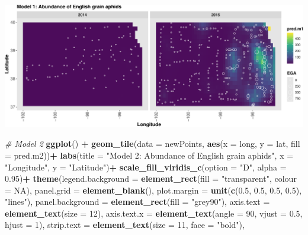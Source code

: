 \documentclass[
]{book}
\newenvironment{Shaded}{\begin{snugshade}}{\end{snugshade}}
\newcommand{\AttributeTok}[1]{\textcolor[rgb]{0.13,0.29,0.53}{#1}}
\newcommand{\CommentTok}[1]{\textcolor[rgb]{0.56,0.35,0.01}{\textit{#1}}}
\newcommand{\ConstantTok}[1]{\textcolor[rgb]{0.56,0.35,0.01}{#1}}
\newcommand{\DecValTok}[1]{\textcolor[rgb]{0.00,0.00,0.81}{#1}}
\newcommand{\FloatTok}[1]{\textcolor[rgb]{0.00,0.00,0.81}{#1}}
\newcommand{\FunctionTok}[1]{\textcolor[rgb]{0.13,0.29,0.53}{\textbf{#1}}}
\newcommand{\NormalTok}[1]{#1}
\newcommand{\SpecialCharTok}[1]{\textcolor[rgb]{0.81,0.36,0.00}{\textbf{#1}}}
\newcommand{\StringTok}[1]{\textcolor[rgb]{0.31,0.60,0.02}{#1}}
\begin{document}
\includegraphics{_main_files/figure-latex/unnamed-chunk-38-1.pdf}

\begin{Shaded}
\begin{Highlighting}[]
\CommentTok{\# Model 2}
\FunctionTok{ggplot}\NormalTok{() }\SpecialCharTok{+}
  \FunctionTok{geom\_tile}\NormalTok{(}\AttributeTok{data =}\NormalTok{ newPoints, }\FunctionTok{aes}\NormalTok{(}\AttributeTok{x =}\NormalTok{ long, }\AttributeTok{y =}\NormalTok{ lat, }\AttributeTok{fill =}\NormalTok{ pred.m2))}\SpecialCharTok{+}
  \FunctionTok{labs}\NormalTok{(}\AttributeTok{title =} \StringTok{"Model 2: Abundance of English grain aphids"}\NormalTok{, }\AttributeTok{x =} \StringTok{"Longitude"}\NormalTok{, }\AttributeTok{y =} \StringTok{"Latitude"}\NormalTok{)}\SpecialCharTok{+}
  \FunctionTok{scale\_fill\_viridis\_c}\NormalTok{(}\AttributeTok{option =} \StringTok{"D"}\NormalTok{, }\AttributeTok{alpha =} \FloatTok{0.95}\NormalTok{)}\SpecialCharTok{+}
  \FunctionTok{theme}\NormalTok{(}\AttributeTok{legend.background =} \FunctionTok{element\_rect}\NormalTok{(}\AttributeTok{fill =} \StringTok{"transparent"}\NormalTok{, }\AttributeTok{colour =} \ConstantTok{NA}\NormalTok{),}
        \AttributeTok{panel.grid =} \FunctionTok{element\_blank}\NormalTok{(),}
        \AttributeTok{plot.margin =} \FunctionTok{unit}\NormalTok{(}\FunctionTok{c}\NormalTok{(}\FloatTok{0.5}\NormalTok{, }\FloatTok{0.5}\NormalTok{, }\FloatTok{0.5}\NormalTok{, }\FloatTok{0.5}\NormalTok{), }\StringTok{"lines"}\NormalTok{),}
        \AttributeTok{panel.background =} \FunctionTok{element\_rect}\NormalTok{(}\AttributeTok{fill =} \StringTok{"grey90"}\NormalTok{),}
        \AttributeTok{axis.text =} \FunctionTok{element\_text}\NormalTok{(}\AttributeTok{size =} \DecValTok{12}\NormalTok{), }
        \AttributeTok{axis.text.x =} \FunctionTok{element\_text}\NormalTok{(}\AttributeTok{angle =} \DecValTok{90}\NormalTok{, }\AttributeTok{vjust =} \FloatTok{0.5}\NormalTok{, }\AttributeTok{hjust =} \DecValTok{1}\NormalTok{),}
        \AttributeTok{strip.text =} \FunctionTok{element\_text}\NormalTok{(}\AttributeTok{size =} \DecValTok{11}\NormalTok{, }\AttributeTok{face =} \StringTok{"bold"}\NormalTok{),}

\end{Highlighting}
\end{Shaded}
\end{document}
